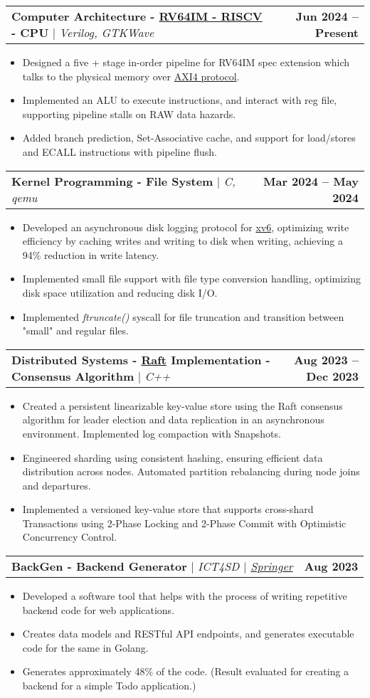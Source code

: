 \documentclass[letterpaper,11pt]{article}
\makeatletter
\newcommand{\resumeItem}[1]{
  \item\small{
    {#1 \vspace{-2pt}}
  }
}
\newcommand{\resumeProjectHeading}[2]{
    \item
    \begin{tabular*}{1.001\textwidth}{l@{\extracolsep{\fill}}r}
      \small#1 & \textbf{\small #2}\\
    \end{tabular*}\vspace{-7pt}
}
\newcommand{\resumeItemListStart}{\begin{itemize}}
\newcommand{\resumeItemListEnd}{\end{itemize}\vspace{-5pt}}
\makeatother
\begin{document}
\resumeProjectHeading
{\textbf{Computer Architecture - \href{https://riscv.org/wp-content/uploads/2017/05/riscv-spec-v2.2.pdf}{RV64IM - RISCV} - CPU} $|$ \emph{Verilog, GTKWave}}{Jun 2024 -- Present}
\resumeItemListStart
\resumeItem{Designed a five + stage in-order pipeline for RV64IM spec extension which talks to the physical memory over \href{https://developer.arm.com/documentation/ihi0022/latest}{AXI4 protocol}.}
\resumeItem{Implemented an ALU to execute instructions, and interact with reg file, supporting pipeline stalls on RAW data hazards.}
\resumeItem{Added branch prediction, Set-Associative cache, and support for load/stores and ECALL instructions with pipeline flush.}
\resumeItemListEnd
\vspace{-17pt}

\resumeProjectHeading
{\textbf{Kernel Programming - File System} $|$ \emph{C, qemu}}{Mar 2024 -- May 2024}
\resumeItemListStart
\resumeItem{
  Developed an asynchronous disk logging protocol for \href{https://pdos.csail.mit.edu/6.828/2012/xv6.html}{xv6}, optimizing write efficiency by caching writes and writing to disk when writing, achieving a 94\% reduction in write latency.
}
\resumeItem{
  Implemented small file support with file type conversion handling, optimizing disk space utilization and reducing disk I/O.

}
\resumeItem{
  Implemented \textit{ftruncate()} syscall for file truncation and transition between "small" and regular files.
}
\resumeItemListEnd
\vspace{-17pt}

\resumeProjectHeading
{\textbf{\normalsize{Distributed Systems - \href{https://raft.github.io/raft.pdf}{Raft} Implementation - Consensus Algorithm}} $|$ \emph{C++}}{Aug 2023 -- Dec 2023}
\resumeItemListStart
\resumeItem{Created a persistent linearizable key-value store using the Raft consensus algorithm for leader election and data replication in an asynchronous environment. Implemented log compaction with Snapshots.}
\resumeItem{Engineered sharding using consistent hashing, ensuring efficient data distribution across nodes. Automated partition rebalancing during node joins and departures.}
\resumeItem{Implemented a versioned key-value store that supports cross-shard Transactions using 2-Phase Locking and 2-Phase Commit with Optimistic Concurrency Control.}
\resumeItemListEnd
\vspace{-17pt}

\resumeProjectHeading
{\textbf{\normalsize{BackGen - Backend Generator}} $|$ \emph{ICT4SD $|$ \href{https://link.springer.com/chapter/10.1007/978-981-99-6568-7_34}{Springer}}}{Aug 2023}
\resumeItemListStart
\resumeItem{Developed a software tool that helps with the process of writing repetitive backend code for web applications.}
\resumeItem{Creates data models and RESTful API endpoints, and generates executable code for the same in Golang.}
\resumeItem{Generates approximately 48\% of the code. (Result evaluated for creating a backend for a simple Todo application.)}
\resumeItemListEnd
\vspace{-17pt}
\end{document}
